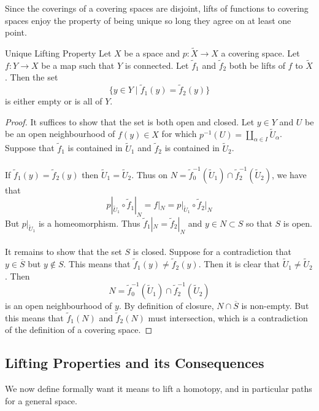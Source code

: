 \documentclass[a4paper]{article}
\begin{document}
Since the coverings of a covering spaces are disjoint, lifts of functions to covering spaces enjoy the property of being unique so long they agree on at least one point. 

\begin{prp}{Unique Lifting Property}{} Let $X$ be a space and $p:\tilde{X}\to X$ a covering space. Let $f:Y\to X$ be a map such that $Y$ is connected. Let $\tilde{f}_1$ and $\tilde{f}_2$ both be lifts of $f$ to $\tilde{X}$. Then the set $$\{y\in Y\;|\;\tilde{f}_1(y)=\tilde{f}_2(y)\}$$ is either empty or is all of $Y$. \tcbline
\begin{proof}
It suffices to show that the set is both open and closed. Let $y\in Y$ and $U$ be be an open neighbourhood of $f(y)\in X$ for which $p^{-1}(U)=\amalg_{\alpha\in I}\tilde{U}_\alpha$. Suppose that $\tilde{f}_1$ is contained in $\tilde{U}_1$ and $\tilde{f}_2$ is contained in $\tilde{U}_2$.  \\~\\

If $\tilde{f}_1(y)=\tilde{f}_2(y)$ then $\tilde{U}_1=\tilde{U}_2$. Thus on $N=\tilde{f}_0^{-1}(\tilde{U}_1)\cap\tilde{f}_2^{-1}(\tilde{U}_2)$, we have that $$p|_{\tilde{U}_1}\circ\tilde{f}_1|_N=f|_N=p|_{\tilde{U}_1}\circ\tilde{f}_2|_N$$ But $p|_{\tilde{U}_1}$ is a homeomorphism. Thus $\tilde{f}_1|_N=\tilde{f}_2|_N$ and $y\in N\subset S$ so that $S$ is open. \\~\\

It remains to show that the set $S$ is closed. Suppose for a contradiction that $y\in\overline{S}$ but $y\notin S$. This means that $\tilde{f}_1(y)\neq\tilde{f}_2(y)$. Then it is clear that $\tilde{U}_1\neq\tilde{U}_2$. Then $$N=\tilde{f}_0^{-1}(\tilde{U}_1)\cap\tilde{f}_2^{-1}(\tilde{U}_2)$$ is an open neighbourhood of $y$. By definition of closure, $N\cap\overline{S}$ is non-empty. But this means that $\tilde{f}_1(N)$ and $\tilde{f}_2(N)$ must intersection, which is a contradiction of the definition of a covering space. 
\end{proof}
\end{prp}

\subsection{Lifting Properties and its Consequences}
We now define formally want it means to lift a homotopy, and in particular paths for a general space. 
\end{document}
